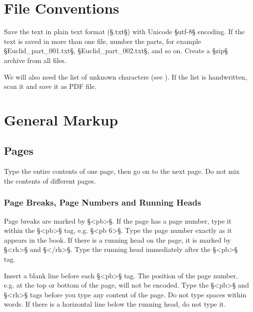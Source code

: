 
\section{File Conventions}
\label{section file conventions}

\begin{mainruleLessImportant}
Save the text in plain text format (§.txt§) with Unicode §utf-8§ encoding. If the text is saved in more than one file, number the parts, for example §Euclid_part_001.txt§, §Euclid_part_002.txt§, and so on. Create a §zip§ archive from all files.

We will also need the list of unknown characters (see ). If the list is handwritten, scan it and save it as PDF file. 
\end{mainruleLessImportant}


\section{General Markup}

\tocspace
\subsection{Pages}

\begin{mainrule}
Type the entire contents of one page, then go on to the next page. Do not mix the contents of different pages.
\end{mainrule}

\subsubsection{Page Breaks, Page Numbers and Running Heads}
\label{section page breaks}

\begin{mainrule}
Page breaks are marked by §<pb>§. If the page has a page number, type it within the §<pb>§ tag, e.g. §<pb 6>§. Type the page number exactly as it appears in the book. If there is a running head on the page, it is marked by §<rh>§ and §</rh>§. Type the running head immediately after the §<pb>§ tag. 
\end{mainrule}

\begin{clarification}
Insert a blank line before each §<pb>§ tag. 
The position of the page number, e.g. at the top or bottom of the page, will not be encoded. Type the §<pb>§ and §<rh>§ tags before you type any content of the page. Do not type spaces within words. If there is a horizontal line below the running head, do not type it.
\end{clarification}

